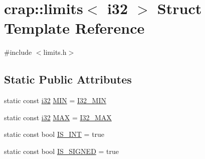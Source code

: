 \hypertarget{structcrap_1_1limits_3_01i32_01_4}{\section{crap\-:\-:limits$<$ i32 $>$ Struct Template Reference}
\label{structcrap_1_1limits_3_01i32_01_4}
}


{\ttfamily \#include $<$limits.\-h$>$}

\subsection*{Static Public Attributes}
\begin{DoxyCompactItemize}
\item 
static const \hyperlink{types_8h_a48d6cd8e4135fb2ff7e7f2dac84089ec}{i32} \hyperlink{structcrap_1_1limits_3_01i32_01_4_ab2a35d740c44e069a91e9b1a60442606}{M\-I\-N} = \hyperlink{types_8h_acf167b5064e33111b4da99625631b8af}{I32\-\_\-\-M\-I\-N}
\item 
static const \hyperlink{types_8h_a48d6cd8e4135fb2ff7e7f2dac84089ec}{i32} \hyperlink{structcrap_1_1limits_3_01i32_01_4_ab7bc98df30a82beffa2e85a1c53e5b86}{M\-A\-X} = \hyperlink{types_8h_a6e0f9d2db6ef5d899eb21081ef248851}{I32\-\_\-\-M\-A\-X}
\item 
static const bool \hyperlink{structcrap_1_1limits_3_01i32_01_4_a6cf2bcdbf1ba35d760823cdb901c94a5}{I\-S\-\_\-\-I\-N\-T} = true
\item 
static const bool \hyperlink{structcrap_1_1limits_3_01i32_01_4_a39bc0425c1c42bf8589dd42be54c4a0a}{I\-S\-\_\-\-S\-I\-G\-N\-E\-D} = true
\end{DoxyCompactItemize}


